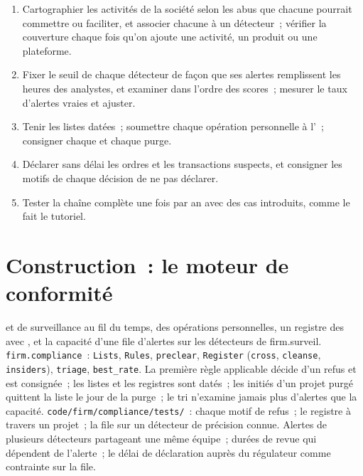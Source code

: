 \begin{method}\label{met:fm:compliance-and-market-abuse:run}
\begin{enumerate}
\item Cartographier les activités de la société selon les abus que chacune pourrait commettre ou faciliter, et associer chacune à un détecteur~; vérifier la couverture chaque
fois qu'on ajoute une activité, un produit ou une plateforme.
\item Fixer le seuil de chaque détecteur de façon que ses alertes remplissent les heures des analystes, et examiner dans l'ordre des scores~; mesurer le taux d'alertes vraies et ajuster.
\item Tenir les listes datées~; soumettre chaque opération personnelle à l'~; consigner chaque  et chaque purge.
\item Déclarer sans délai les ordres et les transactions suspects, et consigner les motifs de chaque décision de ne pas déclarer.
\item Tester la chaîne complète une fois par an avec des cas introduits, comme le fait le tutoriel.
\end{enumerate}
\end{method}

\section{Construction~: le moteur de conformité}\label{bld:fm:compliance-and-market-abuse:compliance}

\begin{build}
  et de surveillance au fil du temps,  des opérations personnelles, un registre des  avec , et la
capacité d'une file d'alertes sur les détecteurs de firm.surveil.
 \texttt{firm.compliance}~: \texttt{Lists}, \texttt{Rules}, \texttt{preclear}, \texttt{Register} (\texttt{cross},
\texttt{cleanse}, \texttt{insiders}), \texttt{triage}, \texttt{best\_rate}.
 La première règle applicable décide d'un refus et est consignée~; les listes et les registres sont datés~; les initiés d'un projet purgé quittent la
liste le jour de la purge~; le tri n'examine jamais plus d'alertes que la capacité.
 \texttt{code/firm/compliance/tests/}~: chaque motif de refus~; le registre à travers un projet~; la file sur un détecteur
de précision connue.
 Alertes de plusieurs détecteurs partageant une même équipe~; durées de revue qui dépendent de l'alerte~; le délai de déclaration auprès du régulateur comme
contrainte sur la file.
\end{build}


